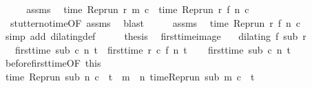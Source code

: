 \begin{isabellebody}
\ {\isacharminus}\isanewline
\ \ \isamarkupfalse%
\ assms{\isacharparenleft}{}{\isacharparenright}\ \isamarkupfalse%
\ {\isacartoucheopen}time\ {\isacharparenleft}{\isacharparenleft}Rep{\isacharunderscore}run\ r{\isacharparenright}\ m\ c{\isacharparenright}\ {\isacharequal}\ time\ {\isacharparenleft}{\isacharparenleft}Rep{\isacharunderscore}run\ r{\isacharparenright}\ {\isacharparenleft}f\ n{\isacharparenright}\ c{\isacharparenright}{\isacartoucheclose}\isanewline
\ \ \ \ \isamarkupfalse%
\ \ stutter{\isacharunderscore}no{\isacharunderscore}time{\isacharbrackleft}OF\ assms{\isacharparenleft}{}{\isacharcomma}{}{\isacharcomma}{}{\isacharparenright}{\isacharbrackright}\ \isamarkupfalse%
\ blast\isanewline
\ \ \isamarkupfalse%
\ \isamarkupfalse%
\ assms{\isacharparenleft}{}{\isacharcomma}{}{\isacharparenright}\ \isamarkupfalse%
\ {\isacartoucheopen}time\ {\isacharparenleft}{\isacharparenleft}Rep{\isacharunderscore}run\ r{\isacharparenright}\ {\isacharparenleft}f\ n{\isacharparenright}\ c{\isacharparenright}\ {\isacharequal}\ {\isasymtau}{\isacartoucheclose}\ \isamarkupfalse%
\ {\isacharparenleft}simp\ add{\isacharcolon}\ dilating{\isacharunderscore}def{\isacharparenright}\isanewline
\ \ \isamarkupfalse%
\ \isamarkupfalse%
\ {\isacharquery}thesis\ \isacommand{{\isachardot}}\isamarkupfalse%
\isanewline
{}\isamarkupfalse%
%
\endisatagproof
{\isafoldproof}%
%
\isadelimproof
\isanewline
%
\endisadelimproof
\isanewline
{}\isamarkupfalse%
\ first{\isacharunderscore}time{\isacharunderscore}image{\isacharcolon}\isanewline
\ \ \ {\isacartoucheopen}dilating\ f\ sub\ r{\isacartoucheclose}\isanewline
\ \ \ {\isacartoucheopen}first{\isacharunderscore}time\ sub\ c\ n\ t\ {\isacharequal}\ first{\isacharunderscore}time\ r\ c\ {\isacharparenleft}f\ n{\isacharparenright}\ t{\isacartoucheclose}\isanewline
%
\isadelimproof
%
\endisadelimproof
%
\isatagproof
{}\isamarkupfalse%
\isanewline
\ \ \isamarkupfalse%
\ {\isacartoucheopen}first{\isacharunderscore}time\ sub\ c\ n\ t{\isacartoucheclose}\isanewline
\ \ \isamarkupfalse%
\ before{\isacharunderscore}first{\isacharunderscore}time{\isacharbrackleft}OF\ this{\isacharbrackright}\isanewline
\ \ \ \ \isamarkupfalse%
\ {\isacharasterisk}{\isacharcolon}{\isacartoucheopen}time\ {\isacharparenleft}{\isacharparenleft}Rep{\isacharunderscore}run\ sub{\isacharparenright}\ n\ c{\isacharparenright}\ {\isacharequal}\ t\ {\isasymand}\ {\isacharparenleft}{\isasymforall}m\ {\isacharless}\ n{\isachardot}\ time{\isacharparenleft}{\isacharparenleft}Rep{\isacharunderscore}run\ sub{\isacharparenright}\ m\ c{\isacharparenright}\ {\isacharless}\ t{\isacharparenright}{\isacartoucheclose}\isanewline

\end{isabellebody}
